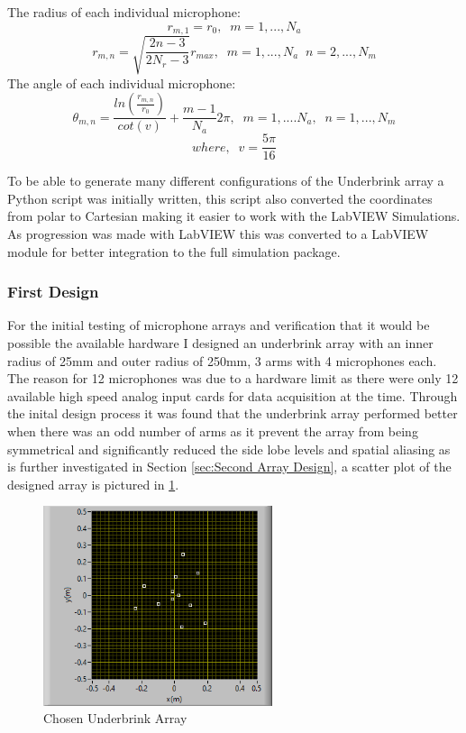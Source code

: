 \documentclass{UoNMCHA}
\numberwithin{equation}{section}
\begin{document}
    The radius of each individual microphone:
    \begin{equation}
        r_{m,1} = r_0,\;\;m=1,...,N_a
    \end{equation}
    \begin{equation*}
        r_{m,n}=\sqrt{\frac{2n-3}{2N_r-3}}r_{max},\;\;m=1,...,N_a\;\;n=2,...,N_m
    \end{equation*}
    The angle of each individual microphone:
    \begin{equation}
        \theta_{m,n} = \frac{ln(\frac{r_{m,n}}{r_0})}{cot(v)} + \frac{m-1}{N_a}2\pi,\;\;m=1,....N_a,\;\;n=1,...,N_m
    \end{equation}
    \begin{equation*}
        where,\;\;v=\frac{5\pi}{16}
    \end{equation*}
    
    To be able to generate many different configurations of the Underbrink array a Python script was initially written, this script also converted the coordinates from polar to Cartesian making it easier to work with the LabVIEW Simulations. As progression was made with LabVIEW this was converted to a LabVIEW module for better integration to the full simulation package. 
\subsubsection{First Design} \label{sec:First Array Design}
    For the initial testing of microphone arrays and verification that it would be possible the available hardware I designed an underbrink array with an inner radius of 25mm and outer radius of 250mm, 3 arms with 4 microphones each. The reason for 12 microphones was due to a hardware limit as there were only 12 available high speed analog input cards for data acquisition at the time. Through the inital design process it was found that the underbrink array performed better when there was an odd number of arms as it prevent the array from being symmetrical and significantly reduced the side lobe levels and spatial aliasing as is further investigated in Section \ref{sec:Second Array Design}, a scatter plot of the designed array is pictured in \ref{fig:Testing Array}.
    
    \begin{figure} [H]
        \centering
        \includegraphics[keepaspectratio, width = 0.6\textwidth]{Figures/CurrentTestingArray.png}
        \caption{Chosen Underbrink Array}
        \label{fig:Testing Array}
    \end{figure}
    
\end{document}
